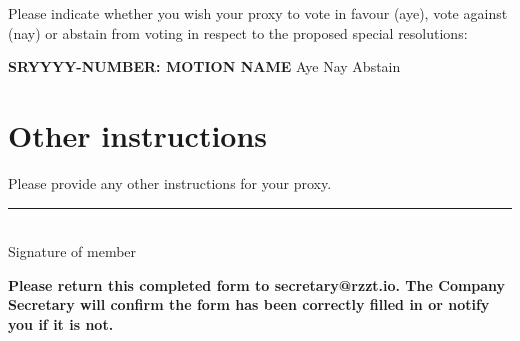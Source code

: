 \documentclass[a4paper,10pt]{article}
\begin{document}
\begin{Form}
Please indicate whether you wish your proxy to vote in favour (aye), vote against (nay) or abstain from voting in respect to the proposed special resolutions:

\textbf{SRYYYY-NUMBER: MOTION NAME} \hfill
\ChoiceMenu[radio,radiosymbol=\ding{108},name=sr1]{ }{ }Aye
\ChoiceMenu[radio,radiosymbol=\ding{108},name=sr1]{ }{ }Nay
\ChoiceMenu[radio,radiosymbol=\ding{108},name=sr1]{ }{ }Abstain

\section{Other instructions}

Please provide any other instructions for your proxy.

\begin{framed}%
  \TextField[width=\textwidth,donotscroll=true,multiline=true,name=instructions]{ }%
\end{framed}%

\vspace{1in}
\rule{0.5\textwidth}{0.5pt}\\
Signature of member

\vspace{1in}

\textbf{Please return this completed form to secretary@rzzt.io. The Company Secretary will confirm the form has been correctly filled in or notify you if it is not.}

\end{Form}
\end{document}
